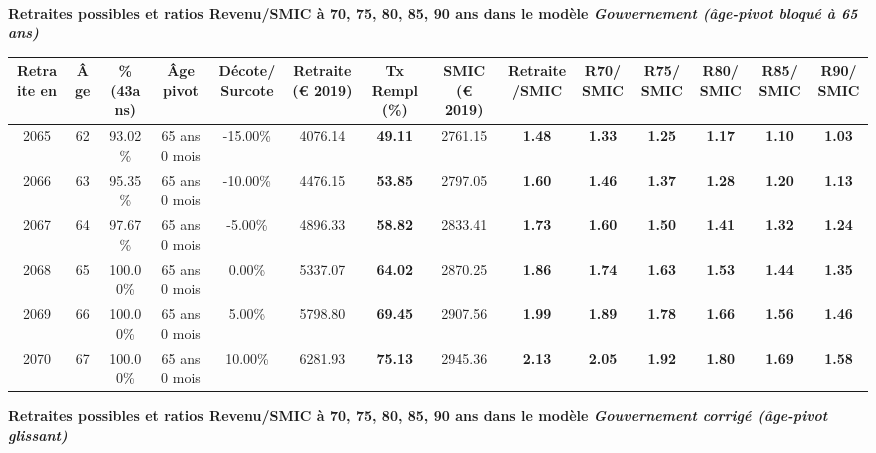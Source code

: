  ~\\{\bf \noindent Retraites possibles et ratios Revenu/SMIC à 70, 75, 80, 85, 90 ans dans le modèle \emph{Gouvernement (âge-pivot bloqué à 65 ans)}}  
 
\begin{adjustbox}{max width=\textwidth} 
\begin{tabular}[htb]{|c|c||c|c|c||c|c||c|c||c|c|c|c|c|} 
\hline 
 Retraite en &  Âge &  \%(43ans) &  Âge pivot &  Décote/Surcote &  Retraite (\euro{} 2019) &  Tx Rempl(\%) &  SMIC (\euro{} 2019) &  Retraite/SMIC &  R70/SMIC &  R75/SMIC &  R80/SMIC &  R85/SMIC &  R90/SMIC \\ 
\hline \hline 
 2065 &  62 &  93.02\% &  65 ans 0 mois &  -15.00\% &  4076.14 &  {\bf 49.11} &  2761.15 &  {\bf 1.48} &  {\bf 1.33} &  {\bf 1.25} &  {\bf 1.17} &  {\bf 1.10} &  {\bf 1.03} \\ 
\hline 
 2066 &  63 &  95.35\% &  65 ans 0 mois &  -10.00\% &  4476.15 &  {\bf 53.85} &  2797.05 &  {\bf 1.60} &  {\bf 1.46} &  {\bf 1.37} &  {\bf 1.28} &  {\bf 1.20} &  {\bf 1.13} \\ 
\hline 
 2067 &  64 &  97.67\% &  65 ans 0 mois &  -5.00\% &  4896.33 &  {\bf 58.82} &  2833.41 &  {\bf 1.73} &  {\bf 1.60} &  {\bf 1.50} &  {\bf 1.41} &  {\bf 1.32} &  {\bf 1.24} \\ 
\hline 
 2068 &  65 &  100.00\% &  65 ans 0 mois &  0.00\% &  5337.07 &  {\bf 64.02} &  2870.25 &  {\bf 1.86} &  {\bf 1.74} &  {\bf 1.63} &  {\bf 1.53} &  {\bf 1.44} &  {\bf 1.35} \\ 
\hline 
 2069 &  66 &  100.00\% &  65 ans 0 mois &  5.00\% &  5798.80 &  {\bf 69.45} &  2907.56 &  {\bf 1.99} &  {\bf 1.89} &  {\bf 1.78} &  {\bf 1.66} &  {\bf 1.56} &  {\bf 1.46} \\ 
\hline 
 2070 &  67 &  100.00\% &  65 ans 0 mois &  10.00\% &  6281.93 &  {\bf 75.13} &  2945.36 &  {\bf 2.13} &  {\bf 2.05} &  {\bf 1.92} &  {\bf 1.80} &  {\bf 1.69} &  {\bf 1.58} \\ 
\hline 
\hline 
\end{tabular} 
\end{adjustbox} 
 
 \vspace{0.1cm} 
{\bf \noindent Retraites possibles et ratios Revenu/SMIC à 70, 75, 80, 85, 90 ans dans le modèle \emph{Gouvernement corrigé (âge-pivot glissant)}}  
 
